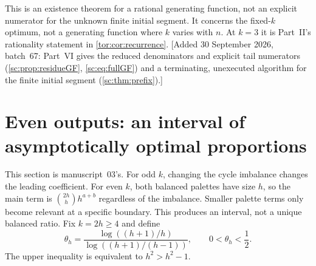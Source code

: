 \documentclass[11pt,a4paper]{article}
\numberwithin{equation}{section}
\theoremstyle{definition}
\theoremstyle{remark}
\begin{document}
This is an existence theorem for a rational generating function, not an
explicit numerator for the unknown finite initial segment. It concerns the
fixed-$k$ optimum, not a generating function where $k$ varies with $n$. At
$k=3$ it is Part~II's rationality statement in \cref{tor:cor:recurrence}.
[Added 30 September 2026, batch~67: Part~VI gives the reduced denominators and explicit tail
numerators (\cref{sc:prop:residueGF}, \eqref{sc:eq:fullGF}) and a
terminating, unexecuted algorithm for the finite initial segment
(\cref{sc:thm:prefix}).]

\section{Even outputs: an interval of asymptotically optimal proportions}\label{evo:sec:plateau}

This section is manuscript~03's. For odd $k$, changing the cycle imbalance
changes the leading coefficient. For even $k$, both balanced palettes have
size $h$, so the main term is $\binom{2h}{h}h^{a+b}$ regardless of the
imbalance. Smaller palette terms only become relevant at a specific boundary.
This produces an interval, not a unique balanced ratio. Fix $k=2h\ge4$ and
define
\begin{equation}\label{evo:da:eq:threshold}
 \theta_h=\frac{\log((h+1)/h)}{\log((h+1)/(h-1))},\qquad 0<\theta_h<\frac12.
\end{equation}
The upper inequality is equivalent to $h^2>h^2-1$.
\end{document}
